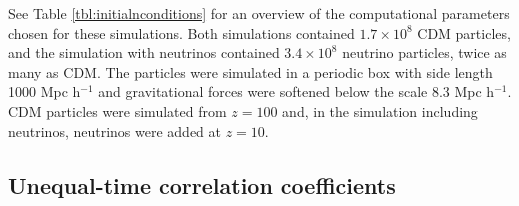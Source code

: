 \documentclass{aastex}
\begin{document}
See Table \ref{tbl:initialnconditions} for an overview of the
computational parameters chosen for these simulations.  Both
simulations contained $1.7 \times 10^{8}$ CDM particles, and the
simulation with neutrinos contained $3.4 \times 10^{8}$ neutrino
particles, twice as many as CDM.  The
particles were simulated in a periodic box with side length 1000 Mpc h$^{-1}$ and
gravitational forces were softened below the scale 8.3 Mpc h$^{-1}$.  CDM
particles were simulated from $z=100$ and, in the simulation including
neutrinos, neutrinos were added at $z=10$.







 

\subsection{Unequal-time correlation coefficients}
\label{sec:Correlators}
\end{document}
